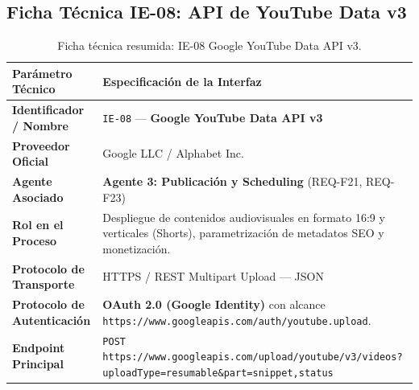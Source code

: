 \documentclass[11pt,a4paper]{article}
\begin{document}
\subsection{Ficha Técnica IE-08: API de YouTube Data v3}\label{sec:ie08}
\begin{table}[h!]
\centering
\small
\begin{tabular}{p{4.5cm} p{11cm}}
\toprule
\textbf{Parámetro Técnico} & \textbf{Especificación de la Interfaz} \\
\midrule
\textbf{Identificador / Nombre} & \texttt{IE-08} --- \textbf{Google YouTube Data API v3} \\
\textbf{Proveedor Oficial} & Google LLC / Alphabet Inc. \\
\textbf{Agente Asociado} & \textbf{Agente 3: Publicación y Scheduling} (REQ-F21, REQ-F23) \\
\textbf{Rol en el Proceso} & Despliegue de contenidos audiovisuales en formato 16:9 y verticales (Shorts), parametrización de metadatos SEO y monetización. \\
\textbf{Protocolo de Transporte} & HTTPS / REST Multipart Upload --- JSON \\
\textbf{Protocolo de Autenticación} & \textbf{OAuth 2.0 (Google Identity)} con alcance \texttt{https://www.googleapis.com/auth/youtube.upload}. \\
\textbf{Endpoint Principal} & \texttt{POST https://www.googleapis.com/upload/youtube/v3/videos?uploadType=resumable\&part=snippet,status} \\
\bottomrule
\end{tabular}
\caption{Ficha técnica resumida: IE-08 Google YouTube Data API v3.}
\end{table}
\end{document}
